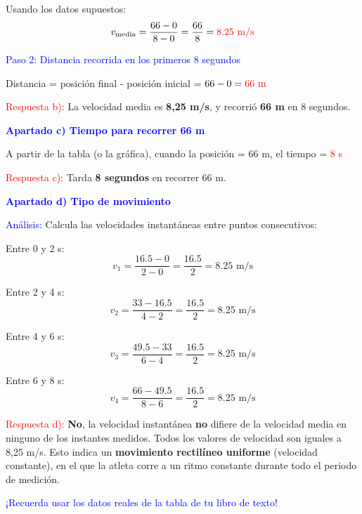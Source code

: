 \begin{exercise}
\begin{solu}
        Usando los datos supuestos:
        \[
            v_{\text{media}} = \frac{66 - 0}{8 - 0} = \frac{66}{8} = \textcolor{red}{8.25 \text{ m/s}}
        \]

        \textcolor{blue}{Paso 2: Distancia recorrida en los primeros 8 segundos}

        Distancia = posición final - posición inicial = $66 - 0 = \textcolor{red}{66 \text{ m}}$

        \textcolor{red}{Respuesta b):} La velocidad media es \textbf{8,25 m/s}, y recorrió \textbf{66 m} en 8 segundos.

        \textbf{\textcolor{blue}{Apartado c) Tiempo para recorrer 66 m}}

        A partir de la tabla (o la gráfica), cuando la posición = 66 m, el tiempo = \textcolor{red}{8 s}

        \textcolor{red}{Respuesta c):} Tarda \textbf{8 segundos} en recorrer 66 m.

        \textbf{\textcolor{blue}{Apartado d) Tipo de movimiento}}

        \textcolor{blue}{Análisis:} Calcula las velocidades instantáneas entre puntos consecutivos:

        Entre 0 y 2 s:
        \[
            v_1 = \frac{16.5 - 0}{2 - 0} = \frac{16.5}{2} = 8.25 \text{ m/s}
        \]

        Entre 2 y 4 s:
        \[
            v_2 = \frac{33 - 16.5}{4 - 2} = \frac{16.5}{2} = 8.25 \text{ m/s}
        \]

        Entre 4 y 6 s:
        \[
            v_3 = \frac{49.5 - 33}{6 - 4} = \frac{16.5}{2} = 8.25 \text{ m/s}
        \]

        Entre 6 y 8 s:
        \[
            v_4 = \frac{66 - 49.5}{8 - 6} = \frac{16.5}{2} = 8.25 \text{ m/s}
        \]

        \textcolor{red}{Respuesta d):} \textbf{No}, la velocidad instantánea \textbf{no} difiere de la velocidad media en ninguno de los instantes medidos. Todos los valores de velocidad son iguales a 8,25 m/s. Esto indica un \textbf{movimiento rectilíneo uniforme} (velocidad constante), en el que la atleta corre a un ritmo constante durante todo el periodo de medición.

        \textcolor{blue}{¡Recuerda usar los datos reales de la tabla de tu libro de texto!}
    \end{solu}
\end{exercise}


